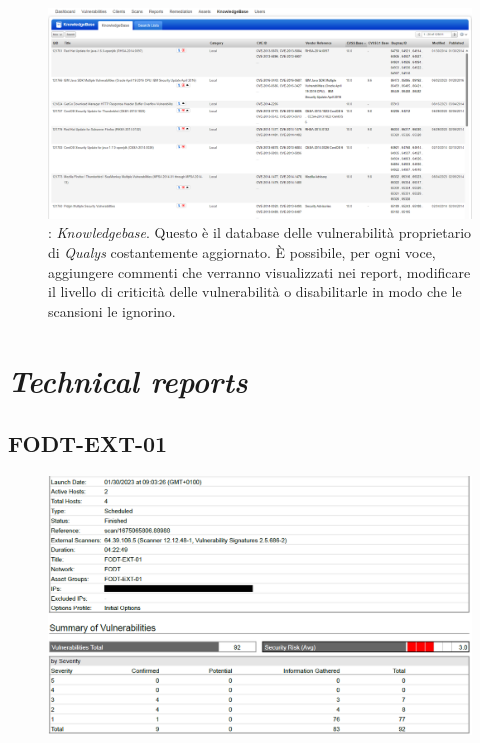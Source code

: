 \documentclass[target=bach,aauheader=]{thud}
\begin{document}
\begin{figure}
\centering
\includegraphics[scale=0.35]{images/qualys_kb.png}
    \caption{: \textit{Knowledgebase}. Questo è il database delle vulnerabilità proprietario di \textit{Qualys} costantemente aggiornato. È possibile, per ogni voce, aggiungere commenti che verranno visualizzati nei report, modificare il livello di criticità delle vulnerabilità o disabilitarle in modo che le scansioni le ignorino.}
\end{figure}


\chapter{\textit{Technical reports}}
\label{appendix:reports}

\section{FODT-EXT-01}

\begin{figure}[h]
    \centering
    \includegraphics[width=1\linewidth]{images/FODT-EXT-01_1.png}
    \caption{}
    \label{fig:fodt-ext-01_1}
\end{figure}
\end{document}
